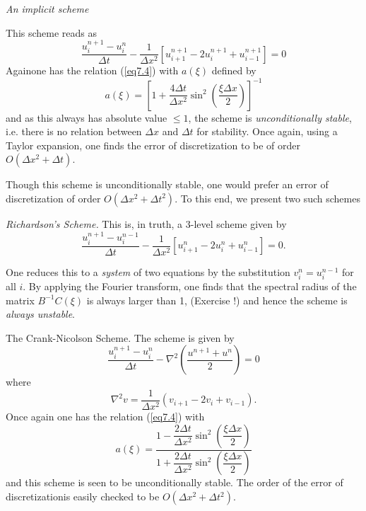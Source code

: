\begin{exam}\label{chap7:exam7.2}
{\em An implicit scheme}

This scheme reads as
\begin{equation*}
\frac{u^{n+1}_i - u^n_i}{\Delta t} - \frac{1}{\Delta x^2}
\left[u^{n+1}_{i+1} - 2u^{n+1}_i + u^{n+1}_{i-1} \right] = 0
\tag{7.6}\label{eq7.6}
\end{equation*}
Again\pageoriginale one has the relation (\ref{eq7.4}) with $a(\xi)$ defined
by 
\begin{equation*}
a(\xi) = \left[ 1+ \frac{4\Delta t}{\Delta x^2} \sin^2 \left(\frac{\xi
    \Delta x}{2}\right) \right]^{-1}\tag{7.7}\label{eq7.7}
\end{equation*}
and as this always has absolute value $\leq 1$, the scheme is {\em
  unconditionally stable}, i.e. there is no relation between $\Delta
x$ and $\Delta t$ for stability. Once again, using a Taylor expansion,
one finds the error of discretization to be of order $O(\Delta x^2 +
\Delta t)$.
\end{exam}

Though this scheme is unconditionally stable, one would prefer an
error of discretization of order $O(\Delta x^2 + \Delta t^2)$. To this
end, we present two such schemes 

\begin{exam}\label{chap7:exam7.3}
{\em Richardson's Scheme.}
This is, in truth, a 3-level scheme given by
\begin{equation*}
\frac{u^{n+1}_i - u^{n-1}_i}{\Delta t} - \frac{1}{\Delta x^2} \left[
  u^n_{i+1} - 2 u^n_i + u^n_{i-1}   \right] = 0. \tag{7.8}\label{eq7.8}
\end{equation*}

One reduces this to a {\em system} of two equations by the
substitution $v^n_i = u^{n-1}_i$ for all $i$. By applying the Fourier
transform, one finds that the spectral radius of the matrix
$B^{-1}C(\xi)$ is always larger than 1, (Exercise !) and hence the
scheme is {\em always unstable}.
\end{exam}

\begin{exam}\label{chap7:exam7.4}
The Crank-Nicolson Scheme. The scheme is given by
\begin{equation*}
\frac{u^{n+1}_i - u^n_i}{\Delta t} - \nabla^2 \left(\frac{u^{n+1} +
  u^n}{2}\right) = 0 \tag{7.9}\label{eq7.9}
\end{equation*}
where
\begin{equation*}
\nabla^2 v = \frac{1}{\Delta x^2} (v_{i+1} - 2v_i + v_{i-1}). 
\tag{7.10}\label{eq7.10}
\end{equation*}
Once again one has the relation (\ref{eq7.4}) with 
\begin{equation*}
a(\xi) = \frac{1-\dfrac{2\Delta t}{\Delta x^2} \sin^2 \left(\dfrac{\xi
    \Delta x}{2} \right)}{1 + \dfrac{2\Delta t}{\Delta x^2} \sin^2
  \left(\dfrac{\xi \Delta x}{2}\right)} \tag{7.11}\label{eq7.11}
\end{equation*}
and this scheme is seen to be unconditionally stable. The order of the
error of discretization\pageoriginale is easily checked to be
$O(\Delta x^2 + \Delta t^2)$. 
\end{exam}

